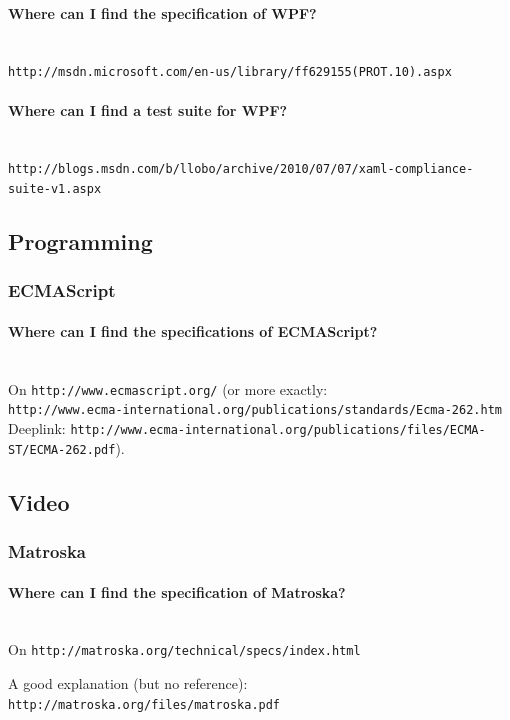 \documentclass[10pt]{scrbook}
\begin{document}
\paragraph{Where can I find the specification of WPF?} ~ \\
\verb|http://msdn.microsoft.com/en-us/library/ff629155(PROT.10).aspx|

\paragraph{Where can I find a test suite for WPF?} ~ \\
\verb|http://blogs.msdn.com/b/llobo/archive/2010/07/07/xaml-compliance-suite-v1.aspx|

\subsection{Programming}

\subsubsection{ECMAScript}

\paragraph{Where can I find the specifications of ECMAScript?} ~ \\
On \verb|http://www.ecmascript.org/| (or more exactly: \\
\verb|http://www.ecma-international.org/publications/standards/Ecma-262.htm| \\
Deeplink: \verb|http://www.ecma-international.org/publications/files/ECMA-ST/ECMA-262.pdf|).

\subsection{Video}

\subsubsection{Matroska}

\paragraph{Where can I find the specification of Matroska?} ~ \\
On \verb|http://matroska.org/technical/specs/index.html|

A good explanation (but no reference): \verb|http://matroska.org/files/matroska.pdf|
\end{document}
